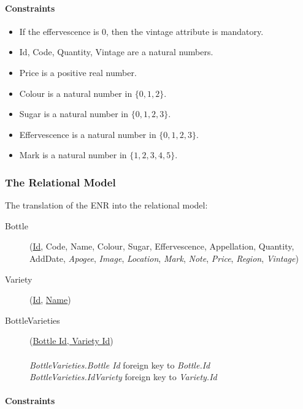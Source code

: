 \paragraph{Constraints}

\begin{itemize}
	\item If the effervescence is 0, then the vintage attribute is mandatory.
	\item Id, Code, Quantity, Vintage are a natural numbers.
	\item Price is a positive real number.
	\item Colour is a natural number in $\{ 0, 1, 2\}$.
	\item Sugar is a natural number in $\{0, 1, 2, 3\}$.
	\item Effervescence is a natural number in $\{0, 1, 2, 3\}$.
	\item Mark is a natural number in $\{1, 2, 3, 4, 5\}$.
	
\end{itemize}

\subsubsection{The Relational Model}

The translation of the ENR into the relational model:

\begin{description}
	\item[Bottle](\underline{Id}, Code, Name, Colour, Sugar, Effervescence, Appellation, Quantity, AddDate, \textit{Apogee}, \textit{Image}, \textit{Location}, \textit{Mark}, \textit{Note}, \textit{Price}, \textit{Region}, \textit{Vintage})
	
	\item[Variety](\underline{Id}, \underline{Name})
	
	\item[BottleVarieties](\underline{Bottle Id, Variety Id})\\ \\
	\emph{BottleVarieties.Bottle Id} foreign key to \emph{Bottle.Id}\\
	\emph{BottleVarieties.IdVariety} foreign key to \emph{Variety.Id}

\end{description}

\paragraph{Constraints}

